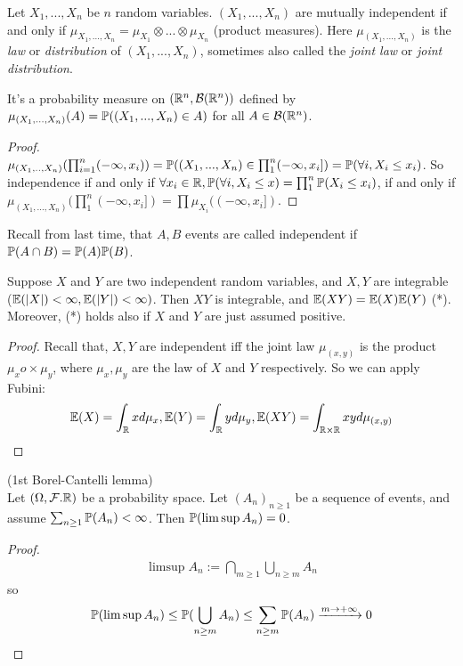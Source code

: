 \documentclass[a4paper]{article}
\begin{document}
\begin{prop}
Let $X_1,...,X_n$ be $n$ random variables. $(X_1,...,X_n)$ are mutually independent if and only if $\mu_{X_1,...,X_n} = \mu_{X_1} \otimes ... \otimes \mu_{X_n}$ (product measures). Here $\mu_{(X_1,...,X_n)}$ is the \emph{law} or \emph{distribution} of $(X_1,...,X_n)$, sometimes also called the \emph{joint law} or \emph{joint distribution}.

It's a probability measure on $(\R^n, \mathcal{B}(\R^n))$ defined by $\mu_{(X_1,...,X_n)}(A) = \P((X_1,...,X_n) \in A)$ for all $A \in \mathcal{B}(\R^n)$.
\begin{proof}
$\mu_{(X_1,..,X_n)} (\prod_{i=1}^n(-\infty,x_i)) = \P((X_1,...,X_n) \in \prod_1^n (-\infty,x_i]) = \P (\forall i, X_i \leq x_i)$. So independence if and only if $\forall x_i \in \R, \P(\forall i, X_i \leq x) = \prod_1^n \P(X_i \leq x_i)$, if and only if $\mu_{(X_1,...,X_n)} (\prod_1^n (-\infty,x_i]) = \prod\mu_{X_i} ((-\infty,x_i])$.
\end{proof}
\end{prop}

Recall from last time, that $A,B$ events are called independent if $\P(A\cap B) = \P(A) \P(B)$.
\begin{prop}
Suppose $X$ and $Y$ are two independent random variables, and $X,Y$ are integrable ($\E(|X|) < \infty, \E(|Y|)<\infty)$. Then $XY$ is integrable, and $\E(XY) = \E(X) \E(Y)$ (*).\\
Moreover, (*) holds also if $X$ and $Y$ are just assumed positive.
\begin{proof}
Recall that, $X,Y$ are independent iff the joint law $\mu_{(x,y)}$ is the product $\mu_x o\times \mu_y$, where $\mu_x,\mu_y$ are the law of $X$ and $Y$ respectively. So we can apply Fubini:
\begin{equation*}
\begin{aligned}
\E(X) = \int_\R x d\mu_x, \E(Y) = \int_\R y d\mu_y, \E(XY) = \int_{\R \times \R} xy d\mu_{(x,y)}
\end{aligned}
\end{equation*}
\end{proof}
\end{prop}

\begin{prop} (1st Borel-Cantelli lemma)\\
Let $(\Omega,\mathcal{F}.\R)$ be a probability space. Let $(A_n)_{n \geq 1}$ be a sequence of events, and assume $\sum_{n \geq 1} \P(A_n) < \infty$. Then $\P(\limsup A_n) = 0$.
\begin{proof}
\begin{equation*}
\begin{aligned}
\limsup A_n := \bigcap_{m \geq 1} \bigcup_{n \geq m} A_n
\end{aligned}
\end{equation*}
so $$\P(\limsup A_n) \leq \P(\bigcup_{n \geq m} A_n) \leq \sum_{n \geq m} \P(A_n) \xrightarrow{m \to +\infty} 0$$
\end{proof}
\end{prop}
\end{document}
